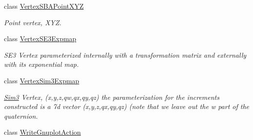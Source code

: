 \begin{DoxyCompactItemize}
\item 
class \mbox{\hyperlink{classg2o_1_1_vertex_s_b_a_point_x_y_z}{Vertex\+S\+B\+A\+Point\+X\+YZ}}
\begin{DoxyCompactList}\small\item\em Point vertex, X\+YZ. \end{DoxyCompactList}\item 
class \mbox{\hyperlink{classg2o_1_1_vertex_s_e3_expmap}{Vertex\+S\+E3\+Expmap}}
\begin{DoxyCompactList}\small\item\em S\+E3 Vertex parameterized internally with a transformation matrix and externally with its exponential map. \end{DoxyCompactList}\item 
class \mbox{\hyperlink{classg2o_1_1_vertex_sim3_expmap}{Vertex\+Sim3\+Expmap}}
\begin{DoxyCompactList}\small\item\em \mbox{\hyperlink{structg2o_1_1_sim3}{Sim3}} Vertex, (x,y,z,qw,qx,qy,qz) the parameterization for the increments constructed is a 7d vector (x,y,z,qx,qy,qz) (note that we leave out the w part of the quaternion. \end{DoxyCompactList}\item 
class \mbox{\hyperlink{classg2o_1_1_write_gnuplot_action}{Write\+Gnuplot\+Action}}
\end{DoxyCompactItemize}
